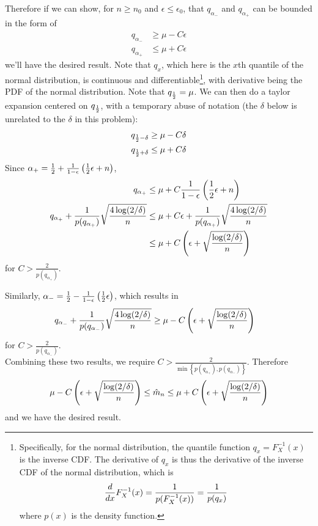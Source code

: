 \documentclass[11pt]{article}
\newcommand{\1}{\mathbb{I}} %
\begin{document}
Therefore if we can show, for $n \geq n_0$ and $\epsilon \leq \epsilon_0$,  that $q_{\alpha_-}$ and $q_{\alpha_+}$ can be bounded in the form of
\begin{align}
	q_{\alpha_-}
	&\geq \mu - C\epsilon \\
	q_{\alpha_+}
	&\leq \mu + C\epsilon 
\end{align}
we'll have the desired result. Note that $q_x$, which here is the $x$th quantile of the normal distribution, is continuous and differentiable\footnote{Specifically, for the normal distribution, the quantile function $q_x = F^{-1}_X(x)$ is the inverse CDF. The derivative of $q_x$ is thus the derivative of the inverse CDF of the normal distribution, which is \begin{align}
		\frac{d}{dx}F^{-1}_X(x) = \frac{1}{ p(F^{-1}_X(x)) } = \frac{1}{p(q_x)}
	\end{align}
where $p(x)$ is the density function.}, with derivative being the PDF of the normal distribution. Note that $q_{\frac{1}{2}} = \mu$. We can then do a taylor expansion centered on $q_{\frac{1}{2}}$, with a temporary abuse of notation (the $\delta$ below is unrelated to the $\delta$ in this problem):
\begin{align}
	q_{\frac{1}{2} - \delta} 
		&\geq \mu - C\delta \\
	q_{\frac{1}{2} + \delta} 
		&\leq \mu + C\delta 
\end{align}
Since $\alpha_+ = \frac{1}{2} + \frac{1}{1-\epsilon}\left(  \frac{1}{2} \epsilon + n  \right)$,
\begin{align}
	q_{\alpha_+} 
		&\leq \mu + C \frac{1}{1-\epsilon}\left(  \frac{1}{2} \epsilon + n  \right)  \\
	q_{\alpha_+} + \frac{1}{p(q_{\alpha_+})} \sqrt{\frac{ 4 \log(2/\delta) }{ n }} 
		&\leq  \mu + C\epsilon + \frac{1}{p(q_{\alpha_+})} \sqrt{\frac{ 4 \log(2/\delta) }{ n }} \\
		&\leq \mu + C\left(   \epsilon + \sqrt{\frac{  \log(2/\delta) }{ n }}  \right)
\end{align}
for $C > \frac{2}{p(q_{\alpha_+})}$. 

Similarly, $\alpha_- = \frac{1}{2} -  \frac{1}{1-\epsilon}\left(  \frac{1}{2} \epsilon   \right)$, which results in
\begin{align}
	q_{\alpha_-} + \frac{1}{p(q_{\alpha_-})} \sqrt{\frac{ 4 \log(2/\delta) }{ n }} 
		&\geq \mu - C \left(   \epsilon +  \sqrt{\frac{  \log(2/\delta) }{ n }}  \right)
\end{align}
for $C >  \frac{2}{p(q_{\alpha_-})}$. \\

Combining these two results, we require $C > \frac{2}{\min\left\{ p(q_{\alpha_+}), p(q_{\alpha_-})    \right\}} $. Therefore 
\begin{align}
		  \mu - C \left(   \epsilon +  \sqrt{\frac{  \log(2/\delta) }{ n }}  \right) 
		\leq \hat m_n 
		\leq \mu + C\left(   \epsilon + \sqrt{\frac{  \log(2/\delta) }{ n }}  \right)
\end{align}
and we have the desired result.




	
	
\end{document}
